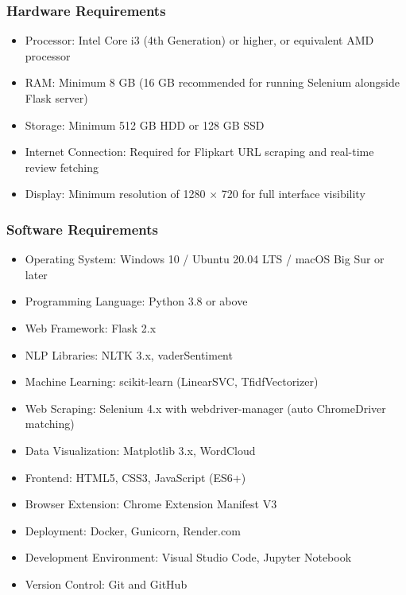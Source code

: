 \documentclass[12pt,a4paper]{report}
\begin{document}
\subsubsection*{Hardware Requirements}

\begin{itemize}
  \item Processor: Intel Core i3 (4th Generation) or higher, or equivalent AMD processor
  \item RAM: Minimum 8 GB (16 GB recommended for running Selenium alongside Flask server)
  \item Storage: Minimum 512 GB HDD or 128 GB SSD
  \item Internet Connection: Required for Flipkart URL scraping and real-time review fetching
  \item Display: Minimum resolution of 1280 $\times$ 720 for full interface visibility
\end{itemize}

\subsubsection*{Software Requirements}

\begin{itemize}
  \item Operating System: Windows 10 / Ubuntu 20.04 LTS / macOS Big Sur or later
  \item Programming Language: Python 3.8 or above
  \item Web Framework: Flask 2.x
  \item NLP Libraries: NLTK 3.x, vaderSentiment
  \item Machine Learning: scikit-learn (LinearSVC, TfidfVectorizer)
  \item Web Scraping: Selenium 4.x with webdriver-manager (auto ChromeDriver matching)
  \item Data Visualization: Matplotlib 3.x, WordCloud
  \item Frontend: HTML5, CSS3, JavaScript (ES6+)
  \item Browser Extension: Chrome Extension Manifest V3
  \item Deployment: Docker, Gunicorn, Render.com
  \item Development Environment: Visual Studio Code, Jupyter Notebook
  \item Version Control: Git and GitHub
\end{itemize}

\end{document}
